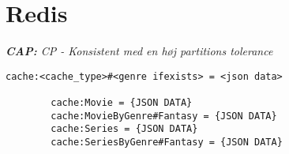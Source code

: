 \section{Redis}
\begin{displayquote}
    \textit{\textbf{CAP:} CP - Konsistent med en høj partitions tolerance}
\end{displayquote}

\begin{tcolorbox}
    \lstset{style=htmlstyle}
    \begin{lstlisting}[language={[Sharp]C}, caption={Logs HBASE Model}, label={lst:cache}]
        cache:<cache_type>#<genre ifexists> = <json data>

        cache:Movie = {JSON DATA}
        cache:MovieByGenre#Fantasy = {JSON DATA}
        cache:Series = {JSON DATA}
        cache:SeriesByGenre#Fantasy = {JSON DATA}
    \end{lstlisting}
\end{tcolorbox}